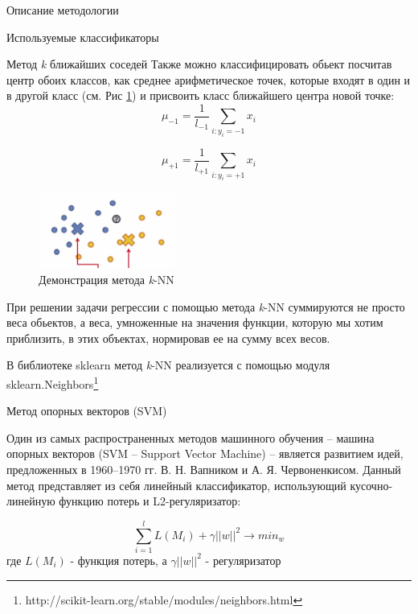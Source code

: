 \begin{section}{Описание методологии}
\begin{subsection}{Используемые классификаторы}
\begin{subsubsection}{Метод \textit{k} ближайших соседей}
Также можно классифицировать обьект посчитав центр обоих классов, как среднее арифметическое точек, которые входят в один и в другой класс (см. Рис \ref{pic:knn4}) и присвоить класс ближайшего центра новой точке:
\begin{equation}
\mu_{-1} = \frac{1}{l_{-1}} \sum\limits_{i: y_i = -1} x_i
\end{equation}

\begin{equation}
\mu_{+1} = \frac{1}{l_{+1}} \sum\limits_{i: y_i = +1} x_i
\end{equation}

\begin{figure}[ht!]
\centering
\includegraphics[width=0.4\textwidth]{pics/knn4}
\caption{Демонстрация метода \textit{k}-NN}
\label{pic:knn4}
\end{figure}

При решении задачи регрессии с помощью метода \textit{k}-NN  суммируются не просто веса обьектов, а веса, умноженные на значения функции, которую мы хотим приблизить, в этих объектах, нормировав ее на сумму всех весов.

В библиотеке sklearn метод \textit{k}-NN реализуется с помощью модуля sklearn.Neighbors\footnote{http://scikit-learn.org/stable/modules/neighbors.html}

\end{subsubsection}

    \begin{subsubsection}{Метод опорных векторов (SVM)}
	\label{svm}

Один из самых распространенных методов машинного обучения – машина опорных векторов (SVM – Support Vector Machine) – является развитием идей, предложенных в 1960–1970 гг. В. Н. Вапником и А. Я. Червоненкисом.
Данный метод представляет из себя линейный классификатор, использующий кусочно-линейную функцию потерь и L2-регуляризатор:

\begin{equation}
\sum\limits_{i=1}^l L(M_i) + \gamma ||w||^2 \rightarrow min_{w}
\end{equation}
где $L(M_i)$ - функция потерь, а $\gamma ||w||^2$ - регуляризатор


\end{subsubsection}
\end{subsection}
\end{section}
